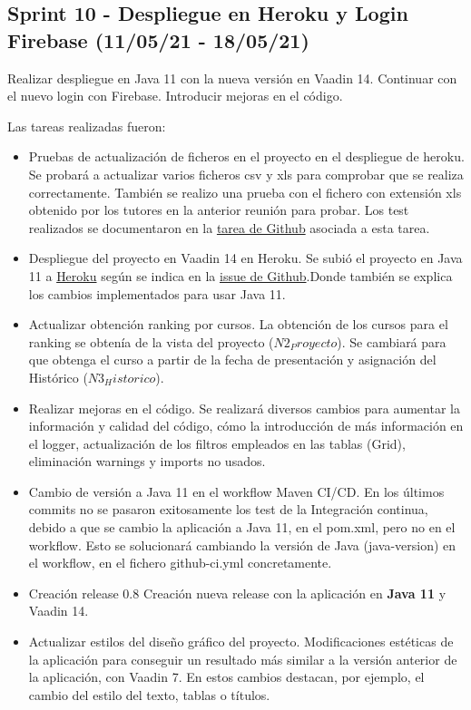 

\subsection{Sprint 10 - Despliegue en Heroku y Login Firebase (11/05/21 - 18/05/21)}
Realizar despliegue en Java 11 con la nueva versión en Vaadin 14. Continuar con el nuevo login con Firebase. Introducir mejoras en el código.

Las tareas realizadas fueron:
\begin{itemize}
	\tightlist
	\item Pruebas de actualización de ficheros en el proyecto en el despliegue de heroku. 
		Se probará a actualizar varios ficheros csv y xls para comprobar que se realiza correctamente. También se realizo una prueba con el fichero con extensión xls obtenido por los tutores en la anterior reunión para probar. Los test realizados se documentaron en la \href{https://github.com/dbo1001/Gestor-TFG-2021/issues/114}{tarea de Github} asociada a esta tarea.
	\item Despliegue del proyecto en Vaadin 14 en Heroku. 
		Se subió el proyecto en Java 11 a \href{https://gestor-tfg-2021.herokuapp.com/}{Heroku} según se indica en la \href{https://github.com/dbo1001/Gestor-TFG-2021/issues/112}{issue de Github}.Donde también se explica los cambios implementados para usar Java 11.
	\item Actualizar obtención ranking por cursos.
		La obtención de los cursos para el ranking se obtenía de la vista del proyecto ($N2_Proyecto$). Se cambiará para que obtenga el curso a partir de la fecha de presentación y asignación del Histórico ($N3_Historico$).
	\item Realizar mejoras en el código.
		Se realizará diversos cambios para aumentar la información y calidad del código, cómo la introducción de más información en el logger, actualización de los filtros empleados en las tablas (Grid), eliminación warnings y imports no usados.
	\item Cambio de versión a Java 11 en el workflow Maven CI/CD.
		En los últimos commits no se pasaron exitosamente los test de la Integración continua, debido a que se cambio la aplicación a Java 11, en el pom.xml, pero no en el workflow. Esto se solucionará cambiando la versión de Java (java-version) en el workflow, en el fichero github-ci.yml concretamente.
	\item Creación release 0.8
		Creación nueva release con la aplicación en \textbf{Java 11} y Vaadin 14.
	\item Actualizar estilos del diseño gráfico del proyecto.
		Modificaciones estéticas de la aplicación para conseguir un resultado más similar a la versión anterior de la aplicación, con Vaadin 7. En estos cambios destacan, por ejemplo, el cambio del estilo del texto, tablas o títulos.
	
\end{itemize}

